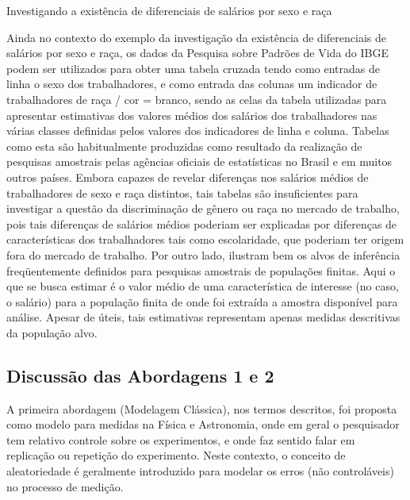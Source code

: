 \documentclass[]{book}
\numberwithin{example}{chapter}
\numberwithin{remark}{chapter}
\numberwithin{definition}{chapter}
\begin{document}
Investigando a existência de diferenciais de salários por sexo e raça

Ainda no contexto do exemplo da investigação da existência de
diferenciais de salários por sexo e raça, os dados da Pesquisa sobre
Padrões de Vida do IBGE podem ser utilizados para obter uma tabela
cruzada tendo como entradas de linha o sexo dos trabalhadores, e como
entrada das colunas um indicador de trabalhadores de raça / cor =
branco, sendo as celas da tabela utilizadas para apresentar estimativas
dos valores médios dos salários dos trabalhadores nas várias classes
definidas pelos valores dos indicadores de linha e coluna. Tabelas como
esta são habitualmente produzidas como resultado da realização de
pesquisas amostrais pelas agências oficiais de estatísticas no Brasil e
em muitos outros países. Embora capazes de revelar diferenças nos
salários médios de trabalhadores de sexo e raça distintos, tais tabelas
são insuficientes para investigar a questão da discriminação de gênero
ou raça no mercado de trabalho, pois tais diferenças de salários médios
poderiam ser explicadas por diferenças de características dos
trabalhadores tais como escolaridade, que poderiam ter origem fora do
mercado de trabalho. Por outro lado, ilustram bem os alvos de inferência
freqüentemente definidos para pesquisas amostrais de populações finitas.
Aqui o que se busca estimar é o valor médio de uma característica de
interesse (no caso, o salário) para a população finita de onde foi
extraída a amostra disponível para análise. Apesar de úteis, tais
estimativas representam apenas medidas descritivas da população alvo.

\subsection{Discussão das Abordagens 1 e
2}\label{discussao-das-abordagens-1-e-2}

A primeira abordagem (Modelagem Clássica), nos termos descritos, foi
proposta como modelo para medidas na Física e Astronomia, onde em geral
o pesquisador tem relativo controle sobre os experimentos, e onde faz
sentido falar em replicação ou repetição do experimento. Neste contexto,
o conceito de aleatoriedade é geralmente introduzido para modelar os
erros (não controláveis) no processo de medição.
\end{document}
